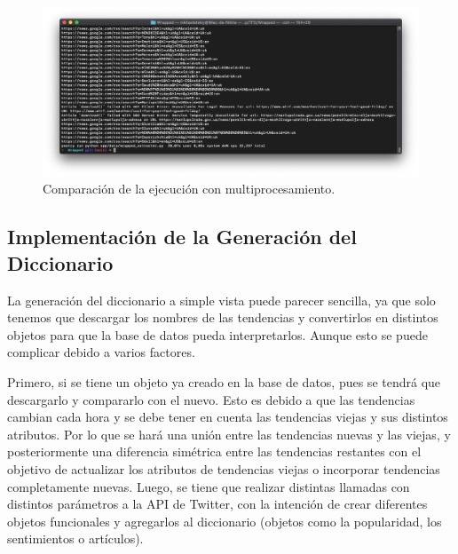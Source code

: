 \begin{figure}[H]
    \centering
    \myfloatalign
    \includegraphics[width=1\textwidth]{gfx/comparacion-multiprocesamiento2.png}
    \caption[Comparación de la ejecución con multiprocesamiento]{Comparación de la ejecución con multiprocesamiento.}\label{gfx:comparacion-multiprocesamiento2}
\end{figure}

\subsection{Implementación de la Generación del Diccionario}
La generación del diccionario a simple vista puede parecer sencilla, ya que solo tenemos que descargar los nombres de las tendencias y convertirlos en distintos objetos para que la base de datos pueda interpretarlos. Aunque esto se puede complicar debido a varios factores.

\vspace{0.3cm}

Primero, si se tiene un objeto ya creado en la base de datos, pues se tendrá que descargarlo y compararlo con el nuevo. Esto es debido a que las tendencias cambian cada hora y se debe tener en cuenta las tendencias viejas y sus distintos atributos. Por lo que se hará una unión entre las tendencias nuevas y las viejas, y posteriormente una diferencia simétrica entre las tendencias restantes con el objetivo de actualizar los atributos de tendencias viejas o incorporar tendencias completamente nuevas. Luego, se tiene que realizar distintas llamadas con distintos parámetros a la API de Twitter, con la intención de crear diferentes objetos funcionales y agregarlos al diccionario (objetos como la popularidad, los sentimientos o artículos).

